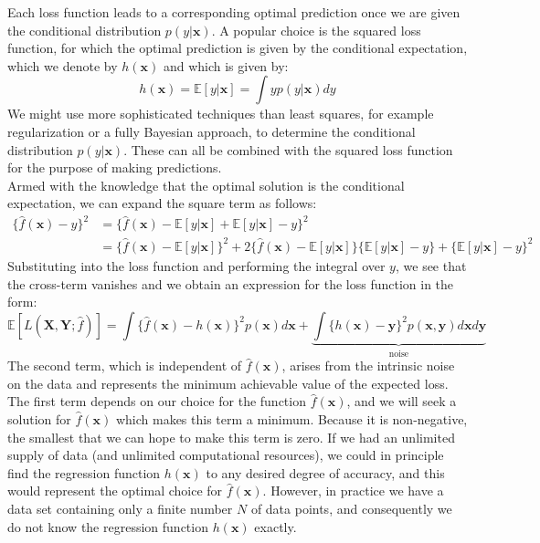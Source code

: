 \documentclass[twoside]{article}
\begin{document}
Each loss function leads to a corresponding optimal prediction once we are given the conditional distribution $p(y | \boldsymbol{x})$. A popular choice is the squared loss function, for which the optimal prediction is given by the conditional expectation, which we denote by $h(\boldsymbol{x})$ and which is given by:
\begin{equation*}
    h(\boldsymbol{x}) = \mathbb{E}[y | \boldsymbol{x}] = \int yp(y | \boldsymbol{x})dy
\end{equation*}
We might use more sophisticated techniques than least squares, for example regularization or a fully Bayesian approach, to determine the conditional distribution $p(y | \boldsymbol{x})$. These can all be combined with the squared loss function for the purpose of making predictions.\\
Armed with the knowledge that the optimal solution is the conditional expectation, we can expand the square term as follows:
\begin{equation*}
\begin{aligned}
    \{\hat{f}(\boldsymbol{x}) - y\}^2 &= \{\hat{f}(\boldsymbol{x}) - \mathbb{E}[y | \boldsymbol{x}] + \mathbb{E}[y | \boldsymbol{x}] - y\}^2\\
    &= \{\hat{f}(\boldsymbol{x}) - \mathbb{E}[y | \boldsymbol{x}]\}^2 + 2\{\hat{f}(\boldsymbol{x}) - \mathbb{E}[y | \boldsymbol{x}]\}\{\mathbb{E}[y | \boldsymbol{x}] - y\} + \{\mathbb{E}[y | \boldsymbol{x}] - y\}^2
\end{aligned}
\end{equation*}
Substituting into the loss function and performing the integral over $y$, we see that the cross-term vanishes and we obtain an expression for the loss function in the form:
\begin{equation}
    \mathbb{E}[L(\boldsymbol{X}, \boldsymbol{Y}; \hat{f})] = \int\{\hat{f}(\boldsymbol{x}) -
    h(\boldsymbol{x})\}^2p(\boldsymbol{x})d\boldsymbol{x} + \underbrace{\int\{ h(\boldsymbol{x}) - \boldsymbol{y}\}^2p(\boldsymbol{x}, \boldsymbol{y})d\boldsymbol{x}d\boldsymbol{y}}_\text{noise}
\end{equation}
The second term, which is independent of $\hat{f}(\boldsymbol{x})$, arises from the intrinsic noise on the data and represents the minimum achievable value of the expected loss. The first term depends on our choice for the function $\hat{f}(\boldsymbol{x})$, and we will seek a solution for $\hat{f}(\boldsymbol{x})$ which makes this term a minimum. Because it is non-negative, the smallest that we can hope to make this term is zero. If we had an unlimited supply of data (and unlimited computational resources), we could in principle find the regression function $h(\boldsymbol{x})$ to any desired degree of accuracy, and this would represent the optimal choice for $\hat{f}(\boldsymbol{x})$. However, in practice we have a data set containing only a finite number $N$ of data points, and consequently we do not know the regression function $h(\boldsymbol{x})$ exactly.\\
\end{document}
